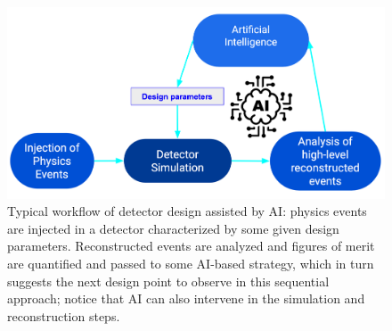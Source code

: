 \begin{figure}[!]
    \centering
    \includegraphics[scale = 0.18]{figs/design_workflow.png}
    \caption{%
    Typical workflow of detector design assisted by AI: physics events are injected in a detector characterized by some given design parameters. Reconstructed events are analyzed and figures of merit are quantified and passed to some AI-based strategy, which in turn suggests the next design point to observe in this sequential approach; notice that AI can also intervene in the simulation and reconstruction steps. %
    }
    \label{fig:design_AI}
\end{figure}

